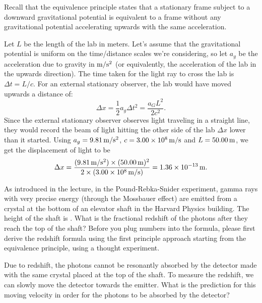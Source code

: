 \documentclass{../../templates/lkx_pset}
\begin{document}
\begin{solution}
	Recall that the equivalence principle states that a stationary frame subject to a downward gravitational potential is equivalent to a frame without any gravitational potential accelerating upwards with the same acceleration.

	Let $L$ be the length of the lab in meters.  Let's assume that the gravitational potential is uniform on the time/distance scales we're considering, so let $a_g$ be the acceleration due to gravity in $\mpsssi{}$ (or equivalently, the acceleration of the lab in the upwards direction). The time taken for the light ray to cross the lab is $\Delta t = L/c$. For an external stationary observer, the lab would have moved upwards a distance of:
	\[
    \Delta x = \frac{1}{2}a_g \Delta t^2 = \frac{a_G L^2}{2c^2}.
	\]
	Since the external stationary observer observes light traveling in a straight line, they would record the beam of light hitting the other side of the lab $\Delta x$ lower than it started.
	Using $a_g = \mpsssi{9.81}$, $c=\mpssi{3.00e8}$ and $L=\msi{50.00}$, we get the displacement of light to be
	\[\Delta x = \frac{(\mpsssi{9.81}) \times (\msi{50.00})^2}{2\times (\mpssi{3.00e8})} = \msi{1.36e-13}.\]
\end{solution}

\begin{problem}{3}
As introduced in the lecture, in the Pound-Rebka-Snider experiment, gamma rays with very precise energy (through the Mossbauer effect) are emitted from a crystal at the bottom of an elevator shaft in the Harvard Physics building. The height of the shaft is . What is the fractional redshift of the photons after they reach the top of the shaft? Before you plug numbers into the formula, please first derive the redshift formula using the first principle approach starting from the equivalence principle, using a thought experiment.

\quad Due to redshift, the photons cannot be resonantly absorbed by the detector made with the same crystal placed at the top of the shaft. To measure the redshift, we can slowly move the detector towards the emitter. What is the prediction for this moving velocity in order for the photons to be
absorbed by the detector?
\end{problem}
\end{document}
